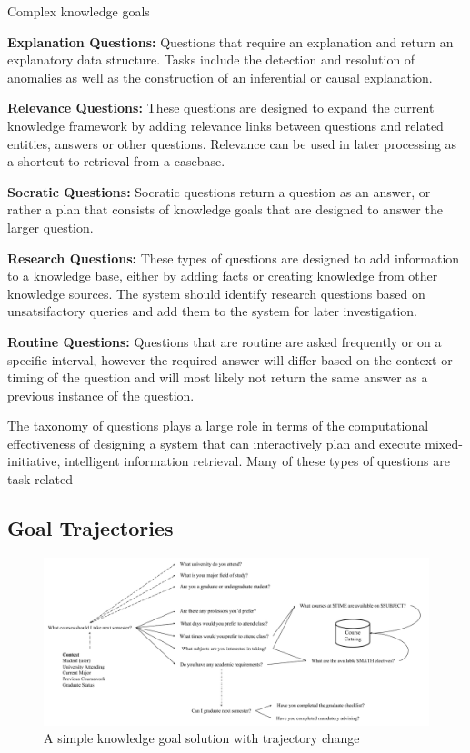 \documentclass[11pt,letterpaper]{article}
\begin{document}
Complex knowledge goals

\textbf{Explanation Questions:} Questions that require an explanation and return an explanatory data structure. Tasks include the detection and resolution of anomalies as well as the construction of an inferential or causal explanation.

\textbf{Relevance Questions:} These questions are designed to expand the current knowledge framework by adding relevance links between questions and related entities, answers or other questions. Relevance can be used in later processing as a shortcut to retrieval from a casebase.

\textbf{Socratic Questions:} Socratic questions return a question as an answer, or rather a plan that consists of knowledge goals that are designed to answer the larger question.

\textbf{Research Questions:} These types of questions are designed to add information to a knowledge base, either by adding facts or creating knowledge from other knowledge sources. The system should identify research questions based on unsatsifactory queries and add them to the system for later investigation.

\textbf{Routine Questions:} Questions that are routine are asked frequently or on a specific interval, however the required answer will differ based on the context or timing of the question and will most likely not return the same answer as a previous instance of the question.

The taxonomy of questions plays a large role in terms of the computational effectiveness of designing a system that can interactively plan and execute mixed-initiative, intelligent information retrieval. Many of these types of questions are task related

\subsection{Goal Trajectories}

\begin{figure}
	\centering
	    \includegraphics[width=\textwidth]{figures/simple_trajectory.png}
    \caption{\label{fig:simple_trajectory.png}A simple knowledge goal solution with trajectory change}
\end{figure}
\end{document}
